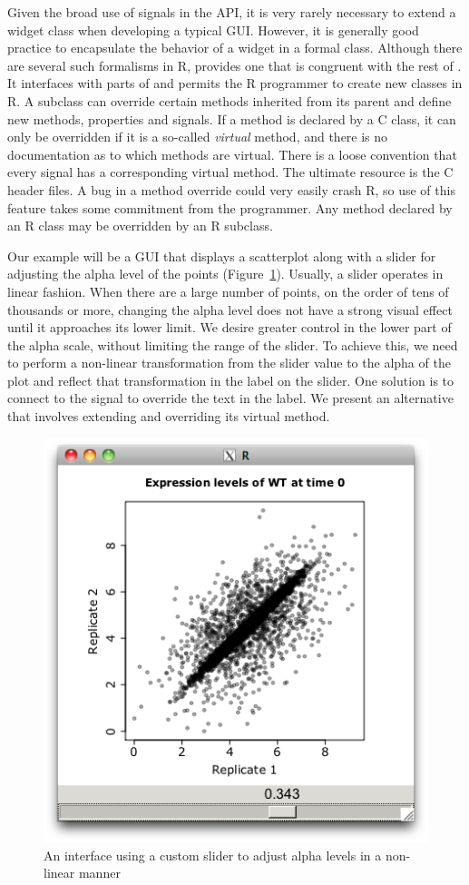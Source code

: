 Given the broad use of signals in the \GTK\/ API, it is very rarely
necessary to extend a widget class when developing a typical
GUI. However, it is generally good practice to encapsulate the
behavior of a widget in a formal class. Although there are several
such formalisms in R,  provides one that is congruent with
the rest of \GTK. It interfaces with parts of  and
permits the R programmer to create new  classes in R. A
subclass can override certain methods inherited from its parent and
define new methods, properties and signals. If a method is declared by
a C class, it can only be overridden if it is a so-called
\textit{virtual} method, and there is no documentation as to which
methods are virtual. There is a loose convention that every signal has
a corresponding virtual method. The ultimate resource is the C header
files. A bug in a method override could very easily crash R, so use of
this feature takes some commitment from the programmer. Any method
declared by an R class may be overridden by an R subclass.

Our example will be a GUI that displays a scatterplot along with a
slider for adjusting the alpha level of the points (Figure~\ref{fig:RGtk2-extend-gobject-slider}). Usually, a slider
operates in linear fashion. When there are a large number of points,
on the order of tens of thousands or more, changing the alpha level
does not have a strong visual effect until it approaches its lower
limit. We desire greater control in the lower part of the alpha scale,
without limiting the range of the slider. To achieve this, we need to
perform a non-linear transformation from the slider value to the alpha
of the plot and reflect that transformation in the label on the
slider. One solution is to connect to the
 signal to override the text in the
label. We present an alternative that involves extending
 and overriding its 
virtual method.

\begin{figure}
  \centering
  \includegraphics[width=.6\textwidth]{fig-RGtk2-extend-gobject} 
  \caption{An interface using a custom slider to adjust alpha levels
    in a non-linear manner}
  \label{fig:RGtk2-extend-gobject-slider}
\end{figure}

